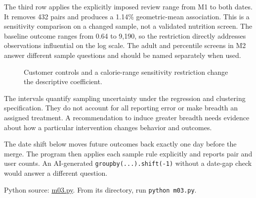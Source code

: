 The third row applies the explicitly imposed review range from M1 to
both dates. It removes 432 pairs and produces a 1.14\% geometric-mean
association. This is a sensitivity comparison on a changed sample, not a
validated nutrition screen. The baseline outcome ranges from 0.64 to
9,190, so the restriction directly addresses observations influential on
the log scale. The adult and percentile screens in M2 answer different
sample questions and should be named separately when used.

\begin{figure}[htbp]
\centering

\caption{Customer controls and a calorie-range sensitivity restriction change the descriptive coefficient.}\label{fig:M03_mhealth_association}
\end{figure}

The intervals quantify sampling uncertainty under the regression and
clustering specification. They do not account for all reporting error or
make breadth an assigned treatment. A recommendation to induce greater
breadth needs evidence about how a particular intervention changes
behavior and outcomes.

The date shift below moves future outcomes back exactly one day before
the merge. The program then applies each sample rule explicitly and
reports pair and user counts. An AI-generated
\texttt{groupby(...).shift(-1)} without a date-gap check would answer a
different question.

\FloatBarrier
{}
Python source:
\href{../03_Data_and_Code/mHealth/recurring_examples/m03.py}{m03.py}.
From its directory, run \texttt{python\ m03.py}.

